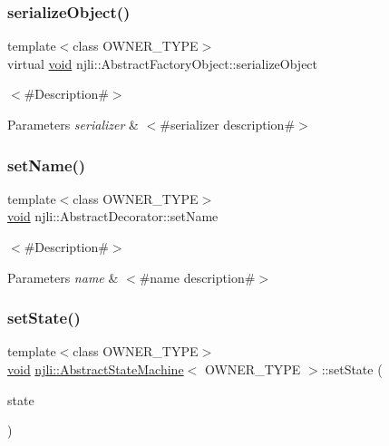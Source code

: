 \subsubsection{\texorpdfstring{serialize\+Object()}{serializeObject()}}
{\footnotesize\ttfamily template$<$class O\+W\+N\+E\+R\+\_\+\+T\+Y\+PE$>$ \\
virtual \mbox{\hyperlink{_thread_8h_af1e856da2e658414cb2456cb6f7ebc66}{void}} njli\+::\+Abstract\+Factory\+Object\+::serialize\+Object}

$<$\#\+Description\#$>$


\begin{DoxyParams}{Parameters}
{\em serializer} & $<$\#serializer description\#$>$ \\
\hline
\end{DoxyParams}
\mbox{\label{classnjli_1_1_abstract_state_machine_a087eb5f8d9f51cc476f12f1d10a3cb95}} 
\subsubsection{\texorpdfstring{set\+Name()}{setName()}}
{\footnotesize\ttfamily template$<$class O\+W\+N\+E\+R\+\_\+\+T\+Y\+PE$>$ \\
\mbox{\hyperlink{_thread_8h_af1e856da2e658414cb2456cb6f7ebc66}{void}} njli\+::\+Abstract\+Decorator\+::set\+Name}

$<$\#\+Description\#$>$


\begin{DoxyParams}{Parameters}
{\em name} & $<$\#name description\#$>$ \\
\hline
\end{DoxyParams}
\mbox{\label{classnjli_1_1_abstract_state_machine_a6a399ba3abc4dbc2f5a0b6d23193c75e}} 
\subsubsection{\texorpdfstring{set\+State()}{setState()}}
{\footnotesize\ttfamily template$<$class O\+W\+N\+E\+R\+\_\+\+T\+Y\+PE$>$ \\
\mbox{\hyperlink{_thread_8h_af1e856da2e658414cb2456cb6f7ebc66}{void}} \mbox{\hyperlink{classnjli_1_1_abstract_state_machine}{njli\+::\+Abstract\+State\+Machine}}$<$ O\+W\+N\+E\+R\+\_\+\+T\+Y\+PE $>$\+::set\+State (\begin{DoxyParamCaption}\item[{\mbox{\hyperlink{classnjli_1_1_abstract_state}{Abstract\+State}}$<$ O\+W\+N\+E\+R\+\_\+\+T\+Y\+PE $>$ $\ast$}]{state }\end{DoxyParamCaption})\hspace{0.3cm}{\ttfamily [private]}}



